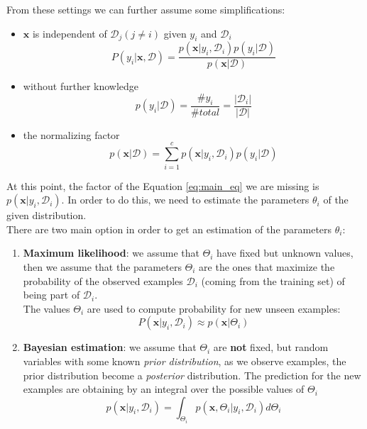 
From these settings we can further assume some simplifications:
\begin{itemize}
	\item $\pmb{x}$ is independent of $\mathcal{D}_{j}(j \neq i)$ given $y_{i}$ and
		$\mathcal{D}_{i}$
		\[
			P(y_{i}|\pmb{x}, \mathcal{D}) = \frac{p(\pmb{x}|y_{i}, \mathcal{D}_{i})p(y_{i}|\mathcal{D})}{p(\pmb{x}|\mathcal{D})}
		\]

	\item without further knowledge
		\[
			p(y_{i}| \mathcal{D}) = \frac{\#y_{i}}{\#total}= \frac{|\mathcal{D}_{i}|}{|\mathcal{D}|}
		\]

	\item the normalizing factor
		\[
			p(\pmb{x}| \mathcal{D}) = \sum_{i=1}^{c}p(\pmb{x}|y_{i}, \mathcal{D}_{i})p
			(y_{i}|\mathcal{D})
		\]
\end{itemize}

At this point, the factor of the Equation \ref{eq:main_eq} we are missing is $p(\pmb
{x}|y_{i}, \mathcal{D}_{i})$. In order to do this, we need to estimate the parameters
$\theta_{i}$ of the given distribution.\\ There are two main option in order to get
an estimation of the parameters $\theta_{i}$:
\begin{enumerate}
	\item \textbf{Maximum likelihood}: we assume that $\Theta_{i}$ have fixed but unknown
		values, then we assume that the parameters $\Theta_{i}$ are the ones that
		maximize the probability of the observed examples $\mathcal{D}_{i}$ (coming from
		the training set) of being part of $\mathcal{D}_{i}$.\\ The values
		$\Theta_{i}$ are used to compute probability for new unseen examples:
		\[
			P(\pmb{x}|y_{i}, \mathcal{D}_{i}) \approx p(\pmb{x}|\Theta_{i})
		\]

	\item \textbf{Bayesian estimation}: we assume that $\Theta_{i}$ are \textbf{not}
		fixed, but random variables with some known \textit{prior distribution}, as we
		observe examples, the prior distribution become a \textit{posterior} distribution.
		The prediction for the new examples are obtaining by an integral over the
		possible values of $\Theta_{i}$
		\[
			p(\pmb{x}|y_{i}, \mathcal{D}_{i}) = \int_{\Theta_i}p(\pmb{x}, \Theta_{i}|y_{i}
			, \mathcal{D}_{i}) d\Theta_{i}
		\]
\end{enumerate}

